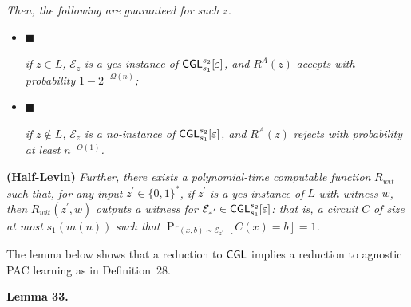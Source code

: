 \emph{Then, the following are guaranteed for such }$z$\emph{.}\par


\begin{itemize}


\item[] 
$\blacksquare$ 


\emph{if }$z\in L$\emph{, }$\mathcal{E}_{z}$\emph{ is a yes-instance of }${\sf CGL}_{s_{1}}^{s_{2}}[\varepsilon]$\emph{, and }$R^{A}(z)$\emph{ accepts with probability }$1-2^{-\Omega(n)}$\emph{;}\par





\item[] 
$\blacksquare$ 


\emph{if }$z\notin L$\emph{, }$\mathcal{E}_{z}$\emph{ is a no-instance of }${\sf CGL}_{s_{1}}^{s_{2}}[\varepsilon]$\emph{, and }$R^{A}(z)$\emph{ rejects with probability at least }$n^{-O(1)}$\emph{.}\par





\end{itemize}




\textbf{(Half-Levin)}\emph{ Further, there exists a polynomial-time computable function }$R_{wit}$\emph{ such that, for any input }$z^{\prime}\in\{0,1\}^{*}$\emph{, if }$z^{\prime}$\emph{ is a yes-instance of }$L$\emph{ with witness }$w$\emph{, then }$R_{wit}(z^{\prime},w)$\emph{ outputs a witness for }$\mathcal{E}_{z^{\prime}}\in{\sf CGL}_{s_{1}}^{s_{2}}[\varepsilon]$\emph{: that is, a circuit }$C$\emph{ of size at most }$s_{1}(m(n))$\emph{ such that }$\Pr_{(x,b)\sim\mathcal{E}_{z^{\prime}}}[C(x)=b]=1$\emph{.}\par






The lemma below shows that a reduction to ${\sf CGL}$ implies a reduction to agnostic PAC learning as in Definition 28.\par





\par\medskip\noindent\textbf{
\textbf{Lemma 33}\textbf{.}
}\par



